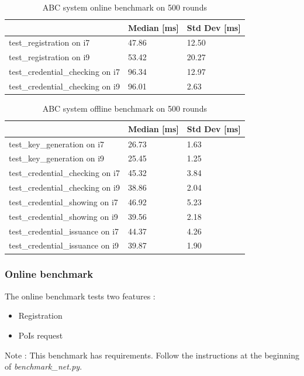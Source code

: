 \documentclass[10pt,conference,compsocconf]{IEEEtran}
\begin{document}
\begin{table}[]
\centering
\begin{tabular}{|l|l|l|}
\hline
                                 & Median [ms] & Std Dev [ms] \\ \hline
test\_registration on i7         & 47.86  & 12.50   \\ \hline
test\_registration on i9         & 53.42  & 20.27   \\ \hline
test\_credential\_checking on i7 & 96.34  & 12.97   \\ \hline
test\_credential\_checking on i9 & 96.01  & 2.63    \\ \hline
\end{tabular}
\caption{ABC system online benchmark on 500 rounds}
\label{benchonline}
\end{table}

\begin{table}[]
\centering
\begin{tabular}{|l|l|l|}
\hline
                                 & Median [ms] & Std Dev [ms] \\ \hline
test\_key\_generation on i7      & 26.73  & 1.63    \\ \hline
test\_key\_generation on i9      & 25.45  & 1.25    \\ \hline
test\_credential\_checking on i7 & 45.32  & 3.84    \\ \hline
test\_credential\_checking on i9 & 38.86  & 2.04    \\ \hline
test\_credential\_showing on i7  & 46.92  & 5.23    \\ \hline
test\_credential\_showing on i9  & 39.56  & 2.18    \\ \hline
test\_credential\_issuance on i7 & 44.37  & 4.26    \\ \hline
test\_credential\_issuance on i9 & 39.87  & 1.90    \\ \hline
\end{tabular}
\caption{ABC system offline benchmark on 500 rounds}
\label{benchoffline}
\end{table}

\subsubsection{Online benchmark}
The online benchmark tests two features :
\begin{itemize}
    \item Registration
    \item PoIs request
\end{itemize}
Note : This benchmark has requirements. Follow the instructions at the beginning of \textit{benchmark\_net.py}.
\end{document}
